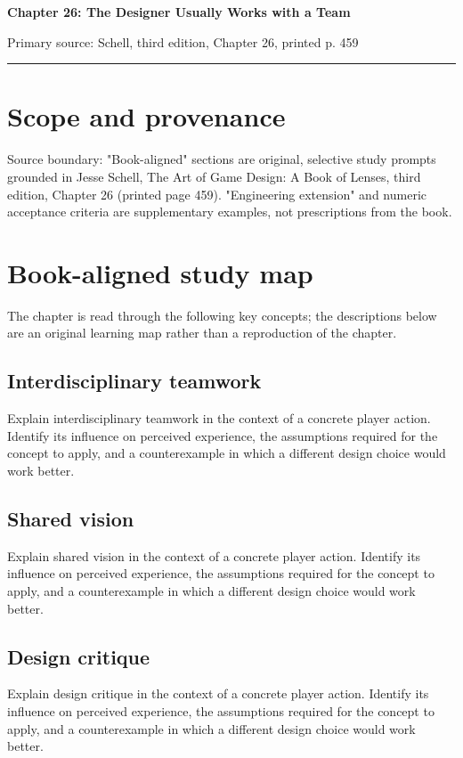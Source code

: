 \documentclass[11pt]{article}
\begin{document}
{\huge\bfseries\color{suiteblue} Chapter 26: The Designer Usually Works with a Team}\par
\vspace{0.15in}
{\normalsize\color{suitegray} Primary source: Schell, third edition, Chapter 26, printed p. 459}\par
\vspace{0.15in}\hrule\vspace{0.15in}

\section{Scope and provenance}
Source boundary: "Book-aligned" sections are original, selective study prompts grounded in Jesse Schell, The Art of Game Design: A Book of Lenses, third edition, Chapter 26 (printed page 459). "Engineering extension" and numeric acceptance criteria are supplementary examples, not prescriptions from the book.


\section{Book-aligned study map}
The chapter is read through the following key concepts; the descriptions below are an original learning map rather than a reproduction of the chapter.


\subsection{Interdisciplinary teamwork}
Explain interdisciplinary teamwork in the context of a concrete player action. Identify its influence on perceived experience, the assumptions required for the concept to apply, and a counterexample in which a different design choice would work better.


\subsection{Shared vision}
Explain shared vision in the context of a concrete player action. Identify its influence on perceived experience, the assumptions required for the concept to apply, and a counterexample in which a different design choice would work better.


\subsection{Design critique}
Explain design critique in the context of a concrete player action. Identify its influence on perceived experience, the assumptions required for the concept to apply, and a counterexample in which a different design choice would work better.
\end{document}
